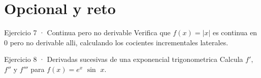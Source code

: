 \documentclass[10pt,a4paper,oneside,openany]{book}
\begin{document}
\section*{Opcional y reto}
\begin{PSevenOptionalFixed}{Ejercicio 7 · Continua pero no derivable}
Verifica que \(f(x)=|x|\) es continua en \(0\) pero no derivable alli, calculando los cocientes incrementales laterales.
\end{PSevenOptionalFixed}
\begin{PSevenOptionalFixed}{Ejercicio 8 · Derivadas sucesivas de una exponencial trigonometrica}
Calcula \(f',\) \(f''\) y \(f'''\) para \(f(x)=e^x\) \(\sin\) \(x\).
\end{PSevenOptionalFixed}
\end{document}
